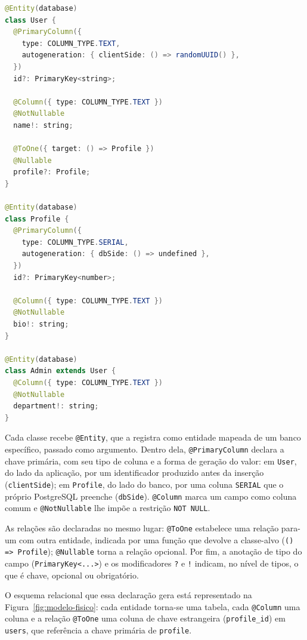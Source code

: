 \begin{lstlisting}[language=Java,escapechar=|,caption={Declaração de entidades com os \emph{decorators} do OOR.},label={lst:decorators}]
@Entity(database)
class User {
  @PrimaryColumn({
    type: COLUMN_TYPE.TEXT,
    autogeneration: { clientSide: () => randomUUID() },
  })
  id?: PrimaryKey<string>;

  @Column({ type: COLUMN_TYPE.TEXT })
  @NotNullable
  name!: string;

  @ToOne({ target: () => Profile })
  @Nullable
  profile?: Profile;
}

@Entity(database)
class Profile {
  @PrimaryColumn({
    type: COLUMN_TYPE.SERIAL,
    autogeneration: { dbSide: () => undefined },
  })
  id?: PrimaryKey<number>;

  @Column({ type: COLUMN_TYPE.TEXT })
  @NotNullable
  bio!: string;
}

@Entity(database)
class Admin extends User {
  @Column({ type: COLUMN_TYPE.TEXT })
  @NotNullable
  department!: string;
}
\end{lstlisting}

Cada classe recebe \texttt{@Entity}, que a registra como entidade mapeada de um banco específico, passado como argumento. Dentro dela, \texttt{@PrimaryColumn} declara a chave primária, com seu tipo de coluna e a forma de geração do valor: em \texttt{User}, do lado da aplicação, por um identificador produzido antes da inserção (\texttt{clientSide}); em \texttt{Profile}, do lado do banco, por uma coluna \texttt{SERIAL} que o próprio PostgreSQL preenche (\texttt{dbSide}). \texttt{@Column} marca um campo como coluna comum e \texttt{@NotNullable} lhe impõe a restrição \texttt{NOT NULL}. 

As relações são declaradas no mesmo lugar: \texttt{@ToOne} estabelece uma relação para-um com outra entidade, indicada por uma função que devolve a classe-alvo (\texttt{() => Profile}); \texttt{@Nullable} torna a relação opcional. Por fim, a anotação de tipo do campo (\texttt{PrimaryKey<...>}) e os modificadores \texttt{?} e \texttt{!} indicam, no nível de tipos, o que é chave, opcional ou obrigatório.

O esquema relacional que essa declaração gera está representado na Figura~\ref{fig:modelo-fisico}: cada entidade torna-se uma tabela, cada \texttt{@Column} uma coluna e a relação \texttt{@ToOne} uma coluna de chave estrangeira (\texttt{profile\_id}) em \texttt{users}, que referência a chave primária de \texttt{profile}.

